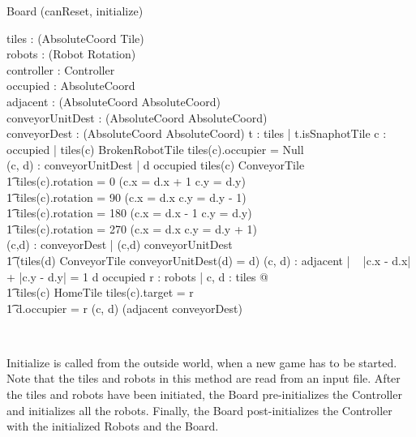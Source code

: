 \begin{class}{Board}
\upharpoonright (canReset, initialize) \\
\begin{state}
tiles : \power (AbsoluteCoord \fun \: \downarrow \! Tile) \\
robots : \power (Robot \fun Rotation) \\
\also \also \also
controller : Controller \\
occupied : \power AbsoluteCoord \\
adjacent : \power (AbsoluteCoord \rel AbsoluteCoord) \\
conveyorUnitDest : \power (AbsoluteCoord \pinj AbsoluteCoord) \\
conveyorDest : \power (AbsoluteCoord \pinj AbsoluteCoord)
\where
\forall t : \ran tiles | \neg t.isSnaphotTile
\also \also \also \also
\forall c : occupied | tiles(c) \in BrokenRobotTile \vee
tiles(c).occupier \not = Null \\
\also \also \also \also
\forall (c, d) : conveyorUnitDest | d \not \in occupied \; \wedge tiles(c) \in ConveyorTile \; \; \wedge \\ \t1
        tiles(c).rotation = 0 \Rightarrow (c.x = d.x + 1 \wedge c.y = d.y) \; \; \wedge \\ \t1
        tiles(c).rotation = 90 \Rightarrow (c.x = d.x \wedge c.y = d.y - 1) \; \; \wedge \\ \t1
        tiles(c).rotation = 180 \Rightarrow (c.x = d.x - 1 \wedge c.y = d.y) \; \; \wedge \\ \t1
        tiles(c).rotation = 270 \Rightarrow (c.x = d.x \wedge c.y = d.y + 1) \; \; \\
\also \also \also \also
\forall (c,d) : conveyorDest | (c,d) \in conveyorUnitDest \star \; \; \wedge \\ \t1 (tiles(d) \not \in ConveyorTile \vee conveyorUnitDest(d) = d)
\also \also \also \also
\forall (c, d) : adjacent | ~ |\!c.x - d.x\!| + |\!c.y - d.y\!| = 1 \wedge d \not \in occupied
\also \also \also \also
\forall r : robots | \exists c, d : \dom tiles @  \\ \t1 tiles(c) \in HomeTile \wedge tiles(c).target = r \; \; \wedge \\ \t1
d.occupier = r \wedge (c, d) \in (adjacent \cup conveyorDest)\star
\end{state} \\
\begin{classcom}
Initialize is called from the outside world, when a new game has to be started. Note that the tiles and robots in this method are read from an input file. After the tiles and robots have been initiated, the Board pre-initializes the Controller and initializes all the robots. Finally, the Board post-initializes the Controller with the initialized Robots and the Board.

\end{classcom}
\end{class}

